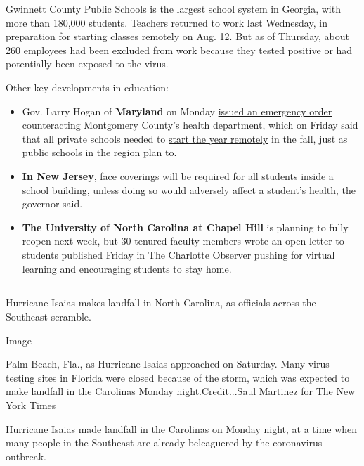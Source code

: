 Gwinnett County Public Schools is the largest school system in Georgia,
with more than 180,000 students. Teachers returned to work last
Wednesday, in preparation for starting classes remotely on Aug. 12. But
as of Thursday, about 260 employees had been excluded from work because
they tested positive or had potentially been exposed to the virus.

Other key developments in education:

\begin{itemize}
\item
  Gov. Larry Hogan of \textbf{Maryland} on Monday
  \href{https://twitter.com/GovLarryHogan/status/1290330304830246912}{issued
  an emergency order} counteracting Montgomery County's health
  department, which on Friday said that all private schools needed to
  \href{https://www.washingtonpost.com/local/education/montgomery-county-health-officials-tell-private-schools-to-start-school-online/2020/08/01/64552b9e-d3fd-11ea-9038-af089b63ac21_story.html}{start
  the year remotely} in the fall, just as public schools in the region
  plan to.
\item
  \textbf{In New Jersey}, face coverings will be required for all
  students inside a school building, unless doing so would adversely
  affect a student's health, the governor said.
\item
  \textbf{The University of North Carolina at Chapel Hill} is planning
  to fully reopen next week, but 30 tenured faculty members wrote an
  open letter to students published Friday in The Charlotte Observer
  pushing for virtual learning and encouraging students to stay home.
\end{itemize}

\hypertarget{-4}{%
\subsection{}\label{-4}}

Hurricane Isaias makes landfall in North Carolina, as officials across
the Southeast scramble.

Image

Palm Beach, Fla., as Hurricane Isaias approached on Saturday. Many virus
testing sites in Florida were closed because of the storm, which was
expected to make landfall in the Carolinas Monday night.Credit...Saul
Martinez for The New York Times

Hurricane Isaias made landfall in the Carolinas on Monday night, at a
time when many people in the Southeast are already beleaguered by the
coronavirus outbreak.


